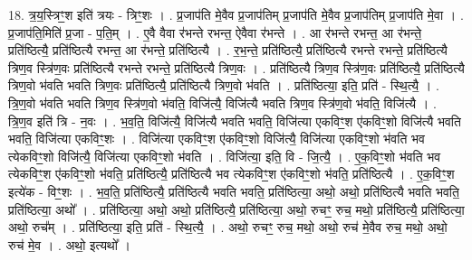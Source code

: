\documentclass[17pt]{extarticle}
\begin{document}
18. त्र॒य॒स्त्रिꣳ॒॒श इति॑ त्रयः - त्रिꣳ॒॒शः । . प्र॒जाप॑ति मे॒वैव प्र॒जाप॑तिम् प्र॒जाप॑ति मे॒वैव प्र॒जाप॑तिम् प्र॒जाप॑ति मे॒वा । . प्र॒जाप॑ति॒मिति॑ प्र॒जा - प॒ति॒म् । . ए॒वै वैवा र॑भन्ते रभन्त॒ ऐवैवा र॑भन्ते । . आ र॑भन्ते रभन्त॒ आ र॑भन्ते॒ प्रति॑ष्ठित्यै॒ प्रति॑ष्ठित्यै रभन्त॒ आ र॑भन्ते॒ प्रति॑ष्ठित्यै । . र॒भ॒न्ते॒ प्रति॑ष्ठित्यै॒ प्रति॑ष्ठित्यै रभन्ते रभन्ते॒ प्रति॑ष्ठित्यै त्रिण॒व स्त्रि॑ण॒वः प्रति॑ष्ठित्यै रभन्ते रभन्ते॒ प्रति॑ष्ठित्यै त्रिण॒वः । . प्रति॑ष्ठित्यै त्रिण॒व स्त्रि॑ण॒वः प्रति॑ष्ठित्यै॒ प्रति॑ष्ठित्यै त्रिण॒वो भ॑वति भवति त्रिण॒वः प्रति॑ष्ठित्यै॒ प्रति॑ष्ठित्यै त्रिण॒वो भ॑वति । . प्रति॑ष्ठित्या॒ इति॒ प्रति॑ - स्थि॒त्यै॒ । . त्रि॒ण॒वो भ॑वति भवति त्रिण॒व स्त्रि॑ण॒वो भ॑वति॒ विजि॑त्यै॒ विजि॑त्यै भवति त्रिण॒व स्त्रि॑ण॒वो भ॑वति॒ विजि॑त्यै । . त्रि॒ण॒व इति॑ त्रि - न॒वः । . भ॒व॒ति॒ विजि॑त्यै॒ विजि॑त्यै भवति भवति॒ विजि॑त्या एकविꣳ॒॒श ए॑कविꣳ॒॒शो विजि॑त्यै भवति भवति॒ विजि॑त्या एकविꣳ॒॒शः । . विजि॑त्या एकविꣳ॒॒श ए॑कविꣳ॒॒शो विजि॑त्यै॒ विजि॑त्या एकविꣳ॒॒शो भ॑वति भव त्येकविꣳ॒॒शो विजि॑त्यै॒ विजि॑त्या एकविꣳ॒॒शो भ॑वति । . विजि॑त्या॒ इति॒ वि - जि॒त्यै॒ । . ए॒क॒विꣳ॒॒शो भ॑वति भव त्येकविꣳ॒॒श ए॑कविꣳ॒॒शो भ॑वति॒ प्रति॑ष्ठित्यै॒ प्रति॑ष्ठित्यै भव त्येकविꣳ॒॒श ए॑कविꣳ॒॒शो भ॑वति॒ प्रति॑ष्ठित्यै । . ए॒क॒विꣳ॒॒श इत्ये॑क - विꣳ॒॒शः । . भ॒व॒ति॒ प्रति॑ष्ठित्यै॒ प्रति॑ष्ठित्यै भवति भवति॒ प्रति॑ष्ठित्या॒ अथो॒ अथो॒ प्रति॑ष्ठित्यै भवति भवति॒ प्रति॑ष्ठित्या॒ अथो᳚ । . प्रति॑ष्ठित्या॒ अथो॒ अथो॒ प्रति॑ष्ठित्यै॒ प्रति॑ष्ठित्या॒ अथो॒ रुचꣳ॒॒ रुच॒ मथो॒ प्रति॑ष्ठित्यै॒ प्रति॑ष्ठित्या॒ अथो॒ रुच᳚म् । . प्रति॑ष्ठित्या॒ इति॒ प्रति॑ - स्थि॒त्यै॒ । . अथो॒ रुचꣳ॒॒ रुच॒ मथो॒ अथो॒ रुच॑ मे॒वैव रुच॒ मथो॒ अथो॒ रुच॑ मे॒व । . अथो॒ इत्यथो᳚ । \newline
\end{document}
